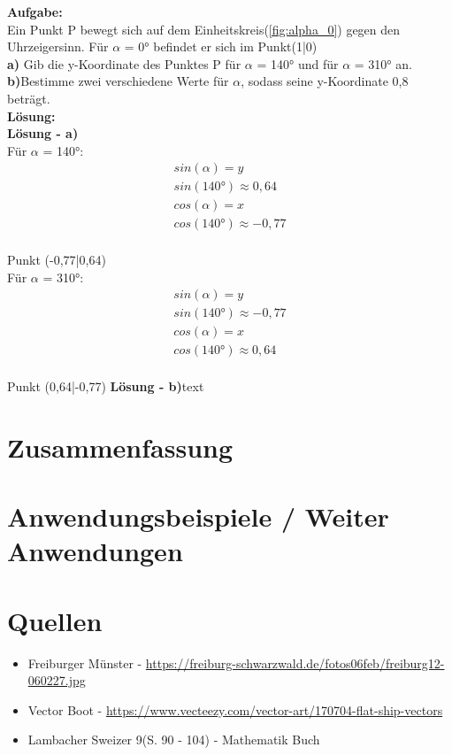 \documentclass[12pt,a4paper]{article}
\begin{document}
\textbf{Aufgabe:}\\
Ein Punkt P bewegt sich auf dem Einheitskreis(\autoref{fig:alpha_0}) gegen den Uhrzeigersinn. Für $\alpha$ = 0° befindet er sich im Punkt(1|0)\\
\textbf{a)} Gib die y-Koordinate des Punktes P für $\alpha$ = 140° und für $\alpha$ = 310° an.\\
\textbf{b)}Bestimme zwei verschiedene Werte für $\alpha$, sodass seine y-Koordinate 0,8 beträgt.\\
\textbf{Lösung:}\\
\textbf{Lösung - a)}\\
Für $\alpha$ = 140°:\\
\begin{align}
	sin(\alpha) = y \tag{1} \\
	sin(140°) \approx 0,64 \tag{2}  \\
	cos(\alpha) = x \tag{3} \\
	cos(140°) \approx -0,77 \tag{4}
\end{align}
\\
Punkt (-0,77|0,64)
\\
Für $\alpha$ = 310°:\\
\begin{align}
	sin(\alpha) = y \tag{1} \\
	sin(140°) \approx -0,77 \tag{2}  \\
	cos(\alpha) = x \tag{3} \\
	cos(140°) \approx 0,64 \tag{4}
\end{align}
\\
Punkt (0,64|-0,77)
\newpage
\textbf{Lösung - b)}text

\newpage
\section{Zusammenfassung}

\section{Anwendungsbeispiele / Weiter Anwendungen}

\newpage
\section{Quellen}
\begin{itemize}
	\item Freiburger Münster - \url{https://freiburg-schwarzwald.de/fotos06feb/freiburg12-060227.jpg}
	\item Vector Boot - \url{https://www.vecteezy.com/vector-art/170704-flat-ship-vectors}
	\item Lambacher Sweizer 9(S. 90 - 104) - Mathematik Buch
\end{itemize}
\end{document}
